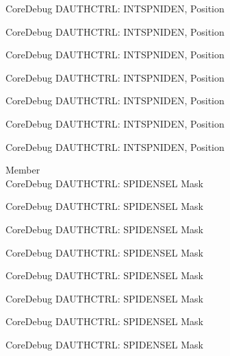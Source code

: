 \begin{DoxyRefList}
\label{deprecated__deprecated000798}%
%
Core\+Debug DAUTHCTRL\+: INTSPNIDEN, Position 

\label{deprecated__deprecated000874}%
%
Core\+Debug DAUTHCTRL\+: INTSPNIDEN, Position 

\label{deprecated__deprecated000937}%
%
Core\+Debug DAUTHCTRL\+: INTSPNIDEN, Position 

\label{deprecated__deprecated001016}%
%
Core\+Debug DAUTHCTRL\+: INTSPNIDEN, Position 

\label{deprecated__deprecated001092}%
%
Core\+Debug DAUTHCTRL\+: INTSPNIDEN, Position 

\label{deprecated__deprecated001195}%
%
Core\+Debug DAUTHCTRL\+: INTSPNIDEN, Position 

\label{deprecated__deprecated001297}%
%
Core\+Debug DAUTHCTRL\+: INTSPNIDEN, Position  
\item[Member \doxylink{group___c_m_s_i_s___s_c_b_gaa043fd13768d57be320c682ca1c9b234}{Core\+Debug\+\_\+\+DAUTHCTRL\+\_\+\+SPIDENSEL\+\_\+\+Msk} ]\hfill \\
\label{deprecated__deprecated000092}%
%
Core\+Debug DAUTHCTRL\+: SPIDENSEL Mask 

\label{deprecated__deprecated000146}%
%
Core\+Debug DAUTHCTRL\+: SPIDENSEL Mask 

\label{deprecated__deprecated000222}%
%
Core\+Debug DAUTHCTRL\+: SPIDENSEL Mask 

\label{deprecated__deprecated000285}%
%
Core\+Debug DAUTHCTRL\+: SPIDENSEL Mask 

\label{deprecated__deprecated000364}%
%
Core\+Debug DAUTHCTRL\+: SPIDENSEL Mask 

\label{deprecated__deprecated000440}%
%
Core\+Debug DAUTHCTRL\+: SPIDENSEL Mask 

\label{deprecated__deprecated000543}%
%
Core\+Debug DAUTHCTRL\+: SPIDENSEL Mask 

\label{deprecated__deprecated000645}%
%
Core\+Debug DAUTHCTRL\+: SPIDENSEL Mask 


\end{DoxyRefList}
